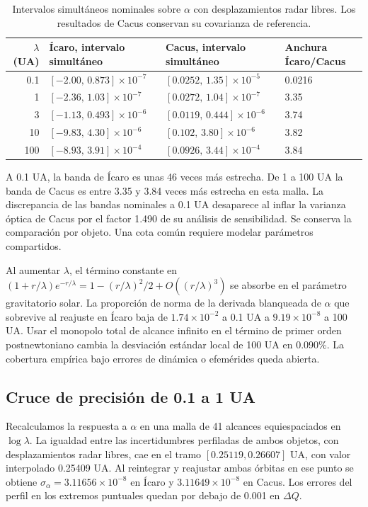 \documentclass[11pt,a4paper]{article}
\begin{document}
\begin{table}[htbp]
\centering
\small
\begin{tabular}{rlll}
\toprule
$\lambda$ (UA) & Ícaro, intervalo simultáneo & Cacus, intervalo simultáneo & Anchura Ícaro/Cacus \\
\midrule
0.1 & $[-2.00,\,0.873]\times10^{-7}$ & $[0.0252,\,1.35]\times10^{-5}$ & 0.0216 \\
1 & $[-2.36,\,1.03]\times10^{-7}$ & $[0.0272,\,1.04]\times10^{-7}$ & 3.35 \\
3 & $[-1.13,\,0.493]\times10^{-6}$ & $[0.0119,\,0.444]\times10^{-6}$ & 3.74 \\
10 & $[-9.83,\,4.30]\times10^{-6}$ & $[0.102,\,3.80]\times10^{-6}$ & 3.82 \\
100 & $[-8.93,\,3.91]\times10^{-4}$ & $[0.0926,\,3.44]\times10^{-4}$ & 3.84 \\
\bottomrule
\end{tabular}
\caption{Intervalos simultáneos nominales sobre $\alpha$ con desplazamientos radar libres. Los resultados de Cacus conservan su covarianza de referencia.}
\label{tab:icarusfive}
\end{table}

A 0.1 UA, la banda de Ícaro es unas 46 veces más estrecha. De 1 a 100 UA la banda de Cacus es entre 3.35 y 3.84 veces más estrecha en esta malla. La discrepancia de las bandas nominales a 0.1 UA desaparece al inflar la varianza óptica de Cacus por el factor 1.490 de su análisis de sensibilidad. Se conserva la comparación por objeto. Una cota común requiere modelar parámetros compartidos.

Al aumentar $\lambda$, el término constante en $(1+r/\lambda)e^{-r/\lambda}=1-(r/\lambda)^2/2+O((r/\lambda)^3)$ se absorbe en el parámetro gravitatorio solar. La proporción de norma de la derivada blanqueada de $\alpha$ que sobrevive al reajuste en Ícaro baja de $1.74\times10^{-2}$ a 0.1 UA a $9.19\times10^{-8}$ a 100 UA. Usar el monopolo total de alcance infinito en el término de primer orden postnewtoniano cambia la desviación estándar local de 100 UA en 0.090\%. La cobertura empírica bajo errores de dinámica o efemérides queda abierta.

\subsection{Cruce de precisión de 0.1 a 1 UA}
Recalculamos la respuesta a $\alpha$ en una malla de 41 alcances equiespaciados en $\log\lambda$. La igualdad entre las incertidumbres perfiladas de ambos objetos, con desplazamientos radar libres, cae en el tramo $[0.25119,0.26607]$ UA, con valor interpolado 0.25409 UA. Al reintegrar y reajustar ambas órbitas en ese punto se obtiene $\sigma_\alpha=3.11656\times10^{-8}$ en Ícaro y $3.11649\times10^{-8}$ en Cacus. Los errores del perfil en los extremos puntuales quedan por debajo de 0.001 en $\Delta Q$.
\end{document}
